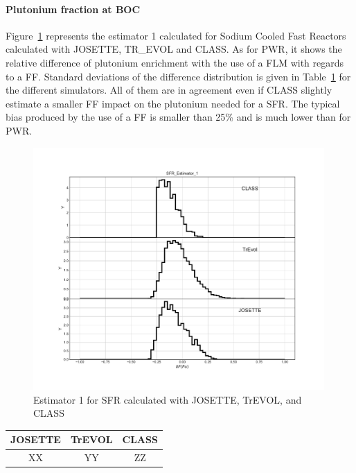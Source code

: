 \paragraph{Plutonium fraction at \gls{BOC}}

Figure~\ref{fig:Est1_SFR} represents the estimator 1 calculated for Sodium
Cooled Fast Reactors calculated with JOSETTE, TR\_EVOL and CLASS. As for
\gls{PWR}, it shows the relative difference of plutonium enrichment with the use
of a \gls{FLM} with regards to a \gls{FF}. Standard deviations of the difference
distribution is given in Table~\ref{table:Est1Dev_SFR} for the different
simulators. All of them are in agreement even if CLASS slightly estimate a
smaller \gls{FF} impact on the plutonium needed for a \gls{SFR}. The typical bias
produced by the use of a \gls{FF} is smaller than 25\% and is much lower than
for \gls{PWR}.   

\begin{figure}[h]
	\begin{center}
		\includegraphics[width = 0.99\textwidth]{../../Feature_1/RAW_DATA/FIG/SFR_Estimator_1.pdf}
		\caption{Estimator 1 for \gls{SFR} calculated with JOSETTE, TrEVOL, and CLASS}
		\label{fig:Est1_SFR}
	\end{center}
\end{figure}

\begin{table}[h]
	\begin{center}
		\begin{tabular}{|c||c||c|}
			\hline 
				JOSETTE & TrEVOL & CLASS \\
			\hline
				XX & YY & ZZ \\
		\end{tabular}
	\end{center}
	\label{table:Est1Dev_SFR}
\end{table}

